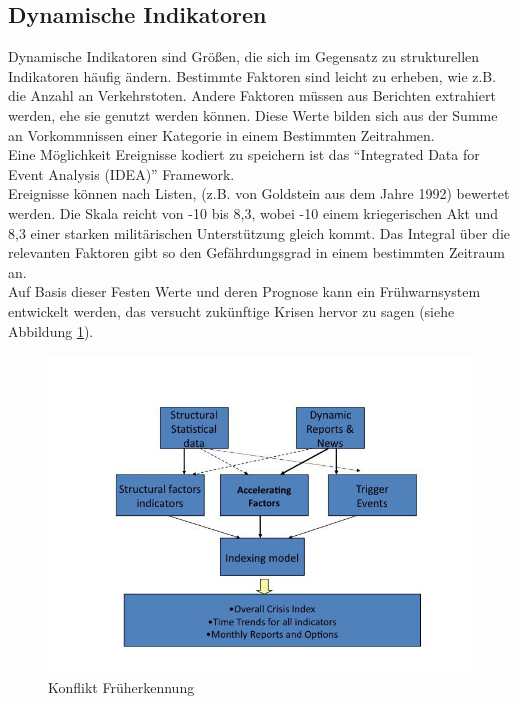 \documentclass[twoside,a4paper]{article}
\begin{document}
\subsection{Dynamische Indikatoren}
Dynamische Indikatoren sind Größen, die sich im Gegensatz zu strukturellen Indikatoren häufig ändern. Bestimmte Faktoren sind leicht zu erheben, wie z.B. die Anzahl an Verkehrstoten. Andere Faktoren müssen aus Berichten extrahiert werden, ehe sie genutzt werden können. Diese Werte bilden sich aus der Summe an Vorkommnissen einer Kategorie in einem Bestimmten Zeitrahmen.\\
Eine Möglichkeit Ereignisse kodiert zu speichern ist das \enquote{Integrated Data for Event Analysis (IDEA)} Framework\cite{idea}.\\
Ereignisse können nach Listen, (z.B. von Goldstein\cite{goldstein} aus dem Jahre 1992) bewertet werden. Die Skala reicht von -10 bis 8,3, wobei -10 einem kriegerischen Akt und 8,3 einer starken militärischen Unterstützung gleich kommt. Das Integral über die relevanten Faktoren gibt so den Gefährdungsgrad in einem bestimmten Zeitraum an.\\
Auf Basis dieser Festen Werte und deren Prognose kann ein Frühwarnsystem entwickelt werden, das versucht zukünftige Krisen hervor zu sagen (siehe Abbildung \ref{img:earlyWarning}).

\begin{figure}[H]
  \centering
  	\includegraphics[width=83.5truemm]{img/earlyWarning}
  \caption{Konflikt Früherkennung\cite{challanges_in_osint}}
  \label{img:earlyWarning}
\end{figure}
\end{document}
